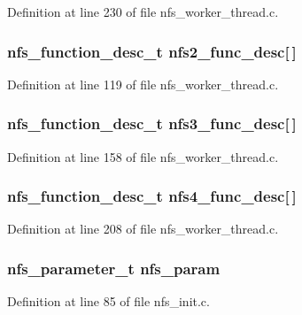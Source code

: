 Definition at line 230 of file nfs\_\-worker\_\-thread.c.
\subsubsection[{nfs2\_\-func\_\-desc}]{\setlength{\rightskip}{0pt plus 5cm}nfs\_\-function\_\-desc\_\-t {\bf nfs2\_\-func\_\-desc}[$\,$]}\label{nfs__dupreq_8c_ad1973964670037b91a33fd6b6e4c40bc}


Definition at line 119 of file nfs\_\-worker\_\-thread.c.
\subsubsection[{nfs3\_\-func\_\-desc}]{\setlength{\rightskip}{0pt plus 5cm}nfs\_\-function\_\-desc\_\-t {\bf nfs3\_\-func\_\-desc}[$\,$]}\label{nfs__dupreq_8c_a177ddde86497df151d3b3ff5c876d90a}


Definition at line 158 of file nfs\_\-worker\_\-thread.c.
\subsubsection[{nfs4\_\-func\_\-desc}]{\setlength{\rightskip}{0pt plus 5cm}nfs\_\-function\_\-desc\_\-t {\bf nfs4\_\-func\_\-desc}[$\,$]}\label{nfs__dupreq_8c_ade3381a451007489495bf0b92585520f}


Definition at line 208 of file nfs\_\-worker\_\-thread.c.
\subsubsection[{nfs\_\-param}]{\setlength{\rightskip}{0pt plus 5cm}nfs\_\-parameter\_\-t {\bf nfs\_\-param}}\label{nfs__dupreq_8c_aeb8fc46586993cf210777049fca03969}


Definition at line 85 of file nfs\_\-init.c.